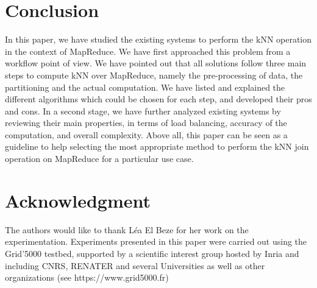 \section{Conclusion}
In this paper, we have studied the existing systems to perform the kNN operation in the context of MapReduce. 
We have first approached this problem from a workflow 
point of view. We have pointed out that all solutions follow three main steps to compute kNN over MapReduce, namely the pre-processing of data,
the partitioning and the actual computation. We have listed and explained the different algorithms which could be chosen 
for each step, and developed their pros and cons.
In a second stage, we have further analyzed existing systems by reviewing their main properties, in terms of load balancing, accuracy of the computation, 
and overall complexity. Above all, this paper can be seen as a guideline to help selecting 
the most appropriate method to perform the kNN join operation on MapReduce for a particular use case.

\section{Acknowledgment}
The authors would like to thank Léa El Beze for her work on the experimentation. Experiments presented in this paper were carried out using the Grid'5000 testbed, supported by a scientific interest group hosted by Inria and including CNRS, RENATER and several Universities as well as other organizations (see https://www.grid5000.fr)

